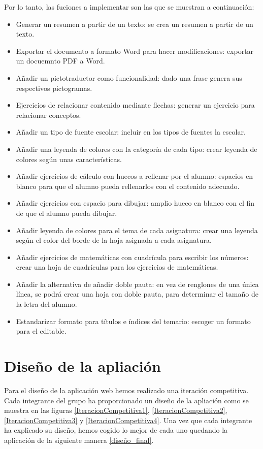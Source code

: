 Por lo tanto, las fuciones a implementar son las que se muestran a continuación:


\begin{itemize}
  \item Generar un resumen a partir de un texto: se crea un resumen a partir de un texto.
  \item Exportar el documento a formato Word para hacer modificaciones: exportar un docuemnto PDF a Word.
  \item Añadir un pictotraductor como funcionalidad: dado una frase genera sus respectivos pictogramas.
  \item Ejercicios de relacionar contenido mediante flechas: generar un ejercicio para relacionar conceptos.
  \item Añadir un tipo de fuente escolar: incluir en los tipos de fuentes la escolar.
  \item Añadir una leyenda de colores con la categoría de cada tipo: crear leyenda de colores según unas características.
  \item  Añadir ejercicios de cálculo con huecos a rellenar por el alumno: espacios en blanco para que el alumno pueda rellenarlos con el contenido adecuado.
  \item  Añadir ejercicios con espacio para dibujar: amplio hueco en blanco con el fin de que el alumno pueda dibujar.
  \item Añadir leyenda de colores para el tema de cada asignatura: crear una leyenda según el color del borde de la hoja asignada a cada asignatura.
  \item Añadir ejercicios de matemáticas con cuadrícula para escribir los números: crear una hoja de cuadrículas para los ejercicios de matemáticas.
  \item Añadir la alternativa de añadir doble pauta: en vez de renglones de una única línea, se podrá crear una hoja con doble pauta, para determinar el tamaño de la letra del alumno.
  \item Estandarizar formato para títulos e índices del temario: escoger un formato para el editable.

\end{itemize}                                               

\section{Diseño de la apliación}
\label{disenyoDeLaAplicacion}
Para el diseño de la aplicación web hemos realizado una iteración competitiva. Cada integrante del grupo ha proporcionado un diseño de la apliación como se muestra en las figuras \ref{IteracionCompetitiva1}, \ref{IteracionCompetitiva2}, \ref{IteracionCompetitiva3} y \ref{IteracionCompetitiva4}.
Una vez que cada integrante ha explicado su diseño, hemos cogido lo mejor de cada uno quedando la aplicación de la siguiente manera \ref{diseño_final}.


